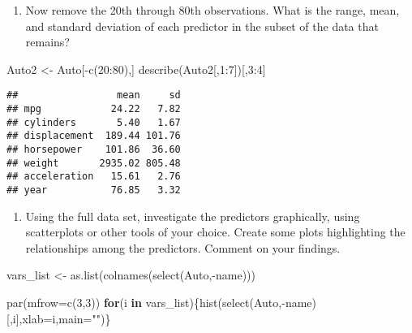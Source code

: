 \documentclass[
]{article}
\newenvironment{Shaded}{\begin{snugshade}}{\end{snugshade}}
\newcommand{\AttributeTok}[1]{\textcolor[rgb]{0.77,0.63,0.00}{#1}}
\newcommand{\ControlFlowTok}[1]{\textcolor[rgb]{0.13,0.29,0.53}{\textbf{#1}}}
\newcommand{\DecValTok}[1]{\textcolor[rgb]{0.00,0.00,0.81}{#1}}
\newcommand{\FunctionTok}[1]{\textcolor[rgb]{0.00,0.00,0.00}{#1}}
\newcommand{\NormalTok}[1]{#1}
\newcommand{\OtherTok}[1]{\textcolor[rgb]{0.56,0.35,0.01}{#1}}
\newcommand{\SpecialCharTok}[1]{\textcolor[rgb]{0.00,0.00,0.00}{#1}}
\newcommand{\StringTok}[1]{\textcolor[rgb]{0.31,0.60,0.02}{#1}}
\providecommand{\tightlist}{%
  \setlength{\itemsep}{0pt}\setlength{\parskip}{0pt}}
\begin{document}
\begin{enumerate}
\def\labelenumi{(\alph{enumi})}
\setcounter{enumi}{3}
\tightlist
\item
  Now remove the 20th through 80th observations. What is the range,
  mean, and standard deviation of each predictor in the subset of the
  data that remains?
\end{enumerate}

\begin{Shaded}
\begin{Highlighting}[]
\NormalTok{Auto2 }\OtherTok{\textless{}{-}}\NormalTok{ Auto[}\SpecialCharTok{{-}}\FunctionTok{c}\NormalTok{(}\DecValTok{20}\SpecialCharTok{:}\DecValTok{80}\NormalTok{),]}
\FunctionTok{describe}\NormalTok{(Auto2[,}\DecValTok{1}\SpecialCharTok{:}\DecValTok{7}\NormalTok{])[,}\DecValTok{3}\SpecialCharTok{:}\DecValTok{4}\NormalTok{]}
\end{Highlighting}
\end{Shaded}

\begin{verbatim}
##                 mean     sd
## mpg            24.22   7.82
## cylinders       5.40   1.67
## displacement  189.44 101.76
## horsepower    101.86  36.60
## weight       2935.02 805.48
## acceleration   15.61   2.76
## year           76.85   3.32
\end{verbatim}

\begin{enumerate}
\def\labelenumi{(\alph{enumi})}
\setcounter{enumi}{4}
\tightlist
\item
  Using the full data set, investigate the predictors graphically, using
  scatterplots or other tools of your choice. Create some plots
  highlighting the relationships among the predictors. Comment on your
  findings.
\end{enumerate}

\begin{Shaded}
\begin{Highlighting}[]
\NormalTok{vars\_list }\OtherTok{\textless{}{-}} \FunctionTok{as.list}\NormalTok{(}\FunctionTok{colnames}\NormalTok{(}\FunctionTok{select}\NormalTok{(Auto,}\SpecialCharTok{{-}}\NormalTok{name)))}

\FunctionTok{par}\NormalTok{(}\AttributeTok{mfrow=}\FunctionTok{c}\NormalTok{(}\DecValTok{3}\NormalTok{,}\DecValTok{3}\NormalTok{))}
\ControlFlowTok{for}\NormalTok{(i }\ControlFlowTok{in}\NormalTok{ vars\_list)\{}\FunctionTok{hist}\NormalTok{(}\FunctionTok{select}\NormalTok{(Auto,}\SpecialCharTok{{-}}\NormalTok{name)[,i],}\AttributeTok{xlab=}\NormalTok{i,}\AttributeTok{main=}\StringTok{""}\NormalTok{)\}}
\end{Highlighting}
\end{Shaded}
\end{document}
